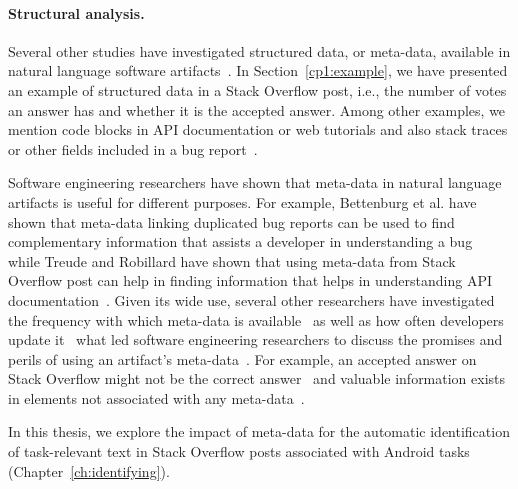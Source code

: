 \paragraph{\textbf{Structural analysis.}} Several other studies have 
investigated structured data, or meta-data, available in
natural language software artifacts~\cite{Ponzanelli2015}. In Section~\ref{cp1:example},
we have presented an example of structured data in a Stack Overflow post, 
i.e., the number of votes an answer has and whether it is the accepted answer.
Among other examples, we mention 
code blocks in API documentation or web tutorials 
and also stack traces or other fields included in a bug report~\cite{Davies2014, Breu2010}. 


Software engineering researchers have shown that meta-data in natural language artifacts 
is useful for different purposes. For example, 
Bettenburg et al. have shown that meta-data linking duplicated bug reports 
can be used to find complementary 
information that assists a developer in understanding a bug~\cite{bettenburg2008}
while Treude and Robillard have shown that using meta-data from Stack Overflow post 
can help in finding information that helps in understanding API documentation~\cite{Treude2016}.
Given its wide use, several other researchers have 
investigated the frequency with which
meta-data is available~\cite{Davies2014, bettenburg2008makes, uddin2015} 
as well as how often developers update it~\cite{ahmad2018, dig2006, shi2011}
what led 
software engineering researchers to discuss the promises and perils of 
using an artifact's meta-data~\cite{kalliamvakou2014, ahmad2018}.
For example, an accepted answer on Stack Overflow 
might not be the correct answer~\cite{wang2018}
and 
valuable information exists in elements not
associated with any meta-data~\cite{zhang2019so}.


In this thesis, we explore the impact of meta-data for the automatic identification 
of task-relevant text in Stack Overflow posts 
associated with Android tasks (Chapter~\ref{ch:identifying}).





